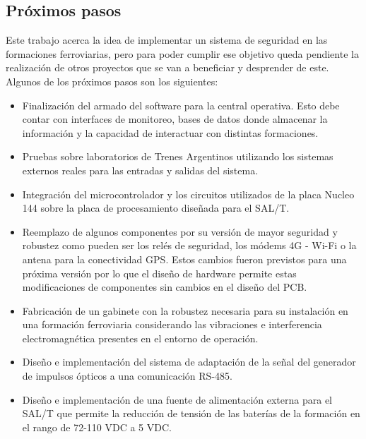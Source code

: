 \subsection{Próximos pasos}

Este trabajo acerca la idea de implementar un sistema de seguridad en las formaciones ferroviarias, pero para poder cumplir ese objetivo queda pendiente la realización de otros proyectos que se van a beneficiar y desprender de este. Algunos de los próximos pasos son los siguientes:

\begin{itemize}
    \item Finalización del armado del software para la central operativa. Esto debe contar con interfaces de monitoreo, bases de datos donde almacenar la información y la capacidad de interactuar con distintas formaciones. 

    \item Pruebas sobre laboratorios de Trenes Argentinos utilizando los sistemas externos reales para las entradas y salidas del sistema.

    \item Integración del microcontrolador y los circuitos utilizados de la placa Nucleo 144 sobre la placa de procesamiento diseñada para el SAL/T.

    \item Reemplazo de algunos componentes por su versión de mayor seguridad y robustez como pueden ser los relés de seguridad, los módems 4G - Wi-Fi o la antena para la conectividad GPS. Estos cambios fueron previstos para una próxima versión por lo que el diseño de hardware permite estas modificaciones de componentes sin cambios en el diseño del PCB. 

    \item Fabricación de un gabinete con la robustez necesaria para su instalación en una formación ferroviaria considerando las vibraciones e interferencia electromagnética presentes en el entorno de operación.

    \item Diseño e implementación del sistema de adaptación de la señal del generador de impulsos ópticos a una comunicación RS-485.

    \item Diseño e implementación de una fuente de alimentación externa para el SAL/T que permite la reducción de tensión de las baterías de la formación en el rango de 72-110 VDC a 5 VDC. 

    
\end{itemize}